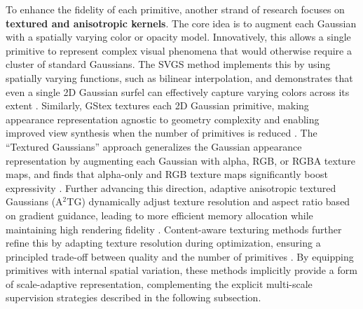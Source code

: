 \documentclass[11pt]{article}
\begin{document}
To enhance the fidelity of each primitive, another strand of research focuses on \textbf{textured and anisotropic kernels}. The core idea is to augment each Gaussian with a spatially varying color or opacity model. Innovatively, this allows a single primitive to represent complex visual phenomena that would otherwise require a cluster of standard Gaussians. The SVGS method implements this by using spatially varying functions, such as bilinear interpolation, and demonstrates that even a single 2D Gaussian surfel can effectively capture varying colors across its extent \cite{ref60}. Similarly, GStex textures each 2D Gaussian primitive, making appearance representation agnostic to geometry complexity and enabling improved view synthesis when the number of primitives is reduced \cite{ref55}. The ``Textured Gaussians'' approach generalizes the Gaussian appearance representation by augmenting each Gaussian with alpha, RGB, or RGBA texture maps, and finds that alpha-only and RGB texture maps significantly boost expressivity \cite{ref17}. Further advancing this direction, adaptive anisotropic textured Gaussians (A\(^2\)TG) dynamically adjust texture resolution and aspect ratio based on gradient guidance, leading to more efficient memory allocation while maintaining high rendering fidelity \cite{ref20}. Content-aware texturing methods further refine this by adapting texture resolution during optimization, ensuring a principled trade-off between quality and the number of primitives \cite{ref61}. By equipping primitives with internal spatial variation, these methods implicitly provide a form of scale-adaptive representation, complementing the explicit multi-scale supervision strategies described in the following subsection.
\end{document}
